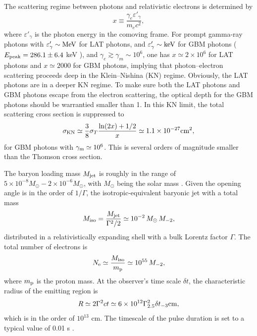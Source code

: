\documentclass[aps,prl,twocolumn,superscriptaddress,showpacs,preprintnumbers,amsmath,amssymb,linenumbers]{revtex4-2}
\begin{document}
The scattering regime between photons and relativistic electrons is determined by
\begin{equation}
x \equiv \frac{\gamma_e \varepsilon'_\gamma}{m_e c^2},
\end{equation}
where $\varepsilon'_\gamma$ is the photon energy in the comoving frame.
For prompt gamma-ray photons with $\varepsilon'_\gamma \sim {\rm MeV}$ for LAT photons, and $\varepsilon'_\gamma \sim {\rm keV}$ for GBM photons ($E_{\rm peak} = 286.1 \pm 6.4$ keV \cite{2021GCN.30380....1M}), and $\gamma_e \gtrsim \gamma_m \sim 10^6$\cite{2019A&A...628A..59O}, one has $x \simeq 2\times 10^6$ for LAT photons and $x \simeq 2000$ for GBM photons, implying that photon–electron scattering proceeds deep in the Klein–Nishina (KN) regime. Obviously, the LAT photons are in a deeper KN regime. To make sure both the LAT photons and GBM photons escape from the electron scattering, the optical depth for the GBM photons should be warrantied smaller than 1.
In this KN limit, the total scattering cross section is suppressed to \cite{1986rpa..book.....R}
\begin{equation}
\sigma_{\rm KN} \simeq 
\frac{3}{8}\sigma_T
\frac{\ln(2x)+1/2}{x} 
\simeq 1.1 \times 10^{-27} {\rm cm}^2,
\label{eq:sigmaKN-GBM}
\end{equation}
for GBM photons with $\gamma_{\rm m} \simeq 10^6$. This is several orders of magnitude smaller than the Thomson cross section.

The baryon loading mass $M_{\rm jet} $ is roughly in the range of $5 \times 10^{-8} M_\odot - 2\times 10^{-6} M_\odot$, with $M_\odot$ being the solar mass \cite{2007PhR...442..166N}. Given the opening angle is in the order of $1/\Gamma$, the isotropic-equivalent baryonic jet with a total mass
\begin{equation}
M_{\rm iso} = \frac{M_{\rm jet}}{\Gamma^2/2} \simeq 10^{-2}\,M_\odot\, M_{-2},
\end{equation}
distributed in a relativistically expanding shell with a bulk Lorentz factor $\Gamma$.
The total number of electrons is
\begin{equation}
N_{\rm e} \simeq \frac{M_{\rm iso}}{m_{\rm  p}} \simeq 10^{55}\,M_{-2},
\end{equation}
where $m_{\rm p}$ is the proton mass. 
At the observer's time scale $\delta t$, the characteristic radius of the emitting region is
\begin{equation}
R \simeq 2 \Gamma^2 c t \simeq 6 \times 10^{12} \Gamma_{2.5}^2 \delta t_{-3} {\rm cm},
\end{equation}
which is in the order of $10^{13}$ cm. The timescale of the pulse duration is set to a typical value of 0.01 s \cite{2014ARA&A..52...43B}.
\end{document}
